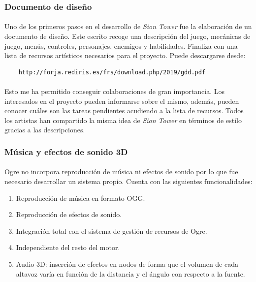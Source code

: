 \documentclass[16pt,spanish]{article}
\def \juego{\emph {Sion Tower} }
\begin{document}
\subsubsection{Documento de diseño}

\paragraph{}
Uno de los primeros pasos en el desarrollo de \juego fue la elaboración
de un documento de diseño. Este escrito recoge una descripción del juego,
mecánicas de juego, menús, controles, personajes, enemigos y habilidades.
Finaliza con una lista de recursos artísticos necesarios para el proyecto.
Puede descargarse desde:

\begin{verbatim}
    http://forja.rediris.es/frs/download.php/2019/gdd.pdf
\end{verbatim}

\paragraph{}
Esto me ha permitido conseguir colaboraciones de gran importancia. Los
interesados en el proyecto pueden informarse sobre el mismo, además,
pueden conocer cuáles son las tareas pendientes acudiendo a la lista de
recursos. Todos los artistas han compartido la misma idea de \juego en
términos de estilo gracias a las descripciones.

\subsubsection{Música y efectos de sonido 3D}

\paragraph{}
Ogre no incorpora reproducción de música ni efectos de sonido por lo que fue
necesario desarrollar un sistema propio. Cuenta con las siguientes
funcionalidades:

\begin{enumerate}
    \item Reproducción de música en formato OGG.
    \item Reproducción de efectos de sonido.
    \item Integración total con el sistema de gestión de recursos de Ogre.
    \item Independiente del resto del motor.
    \item Audio 3D: inserción de efectos en nodos de forma que el volumen
    de cada altavoz varía en función de la distancia y el ángulo con respecto
    a la fuente.
\end{enumerate}
\end{document}
